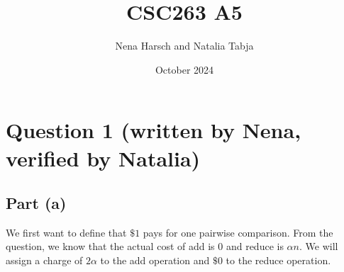 \documentclass{article}
\title{CSC263 A5}
\author{Nena Harsch and Natalia Tabja}
\date{October 2024}
\begin{document}
\maketitle

\section*{Question 1 (written by Nena,  verified by Natalia)}
\subsection*{Part (a)}
We first want to define that $\$1$ pays for one pairwise comparison. From the question, we know that the actual cost of add is 0 and reduce is $\alpha{n}$. We will assign a charge of $2\alpha$ to the add operation and $\$0$ to the reduce operation.
\end{document}
